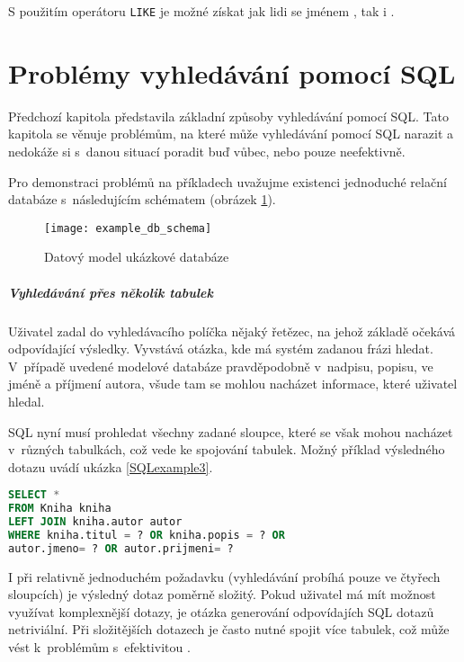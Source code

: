 \documentclass[11pt,oneside]{fithesis2}
\begin{document}
S použitím operátoru \texttt{LIKE} je možné získat jak lidi se jménem , tak i . 

\section{Problémy vyhledávání pomocí SQL}
\label{ProblemyVyhledavaniSQL}
Předchozí kapitola představila základní způsoby vyhledávání pomocí SQL. Tato kapitola se věnuje problémům, na které může vyhledávání pomocí SQL narazit a nedokáže si s~danou situací poradit buď vůbec, nebo pouze neefektivně.

Pro demonstraci problémů na příkladech uvažujme existenci jednoduché relační databáze s~následujícím schématem (obrázek \ref{example_schema}).

\begin{figure}[htbp]
	\begin{center}
		\texttt{[image: example\_db\_schema]}
	\end{center}
	\caption{Datový model ukázkové databáze}	
	\label{example_schema}
\end{figure}

\subparagraph{Vyhledávání přes několik tabulek}
Uživatel zadal do vyhledávacího políčka nějaký řetězec, na jehož základě očekává odpovídající výsledky. Vyvstává otázka, kde má systém zadanou frázi hledat. V~případě uvedené modelové databáze pravděpodobně v~nadpisu, popisu, ve jméně a příjmení autora, všude tam se mohlou nacházet informace, které uživatel hledal. 

SQL nyní musí prohledat všechny zadané sloupce, které se však mohou nacházet v~různých tabulkách, což vede ke spojování tabulek. Možný příklad výsledného dotazu uvádí ukázka \ref{SQLexample3}.

\begin{lstlisting}[language=SQL, caption =  SQL dotaz vyhledávající přes několik tabulek, label = SQLexample3]
SELECT *
FROM Kniha kniha 
LEFT JOIN kniha.autor autor 
WHERE kniha.titul = ? OR kniha.popis = ? OR 
autor.jmeno= ? OR autor.prijmeni= ?
\end{lstlisting}

I při relativně jednoduchém požadavku (vyhledávání probíhá pouze ve čtyřech sloupcích) je výsledný dotaz poměrně složitý. Pokud uživatel má mít možnost využívat komplexnější
dotazy, je otázka generování odpovídajích SQL dotazů netriviální. Při složitějších dotazech je často nutné spojit více tabulek, což může vést k~problémům s~efektivitou \cite[s.~9]{HibernateSearchAction}.
\end{document}
